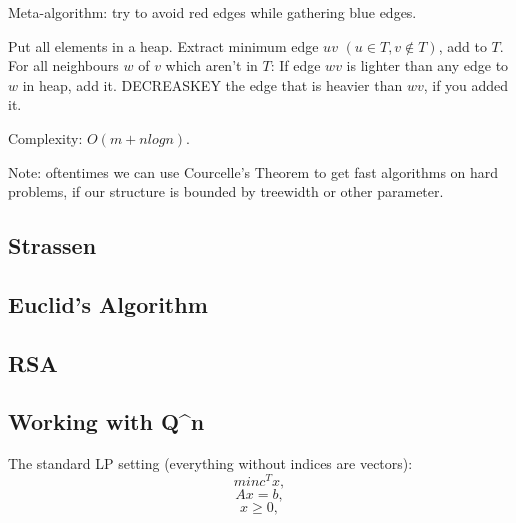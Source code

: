

Meta-algorithm: try to avoid red edges while gathering blue edges.

\itemize\ibull
\: Put all elements in a heap.
\: Extract minimum edge $uv$ $(u ∈ T, v ∉ T)$, add to $T$.
\: For all neighbours $w$ of $v$ which aren't in $T$:
\: If edge $wv$ is lighter than any edge to $w$ in heap, add it.
\: DECREASKEY the edge that is heavier than $wv$, if you added it.
\endlist

Complexity: $O(m + n log n)$.

Note: oftentimes we can use Courcelle's Theorem to get fast algorithms
on hard problems, if our structure is bounded by treewidth or other parameter.



\subsection{Strassen}

\subsection{Euclid's Algorithm}

\subsection{RSA}

\subsection{Working with Q^n}


 


The standard LP setting (everything without indices are vectors):
$$ min c^Tx, $$
$$ Ax = b, $$
$$ x ≥ 0, $$

